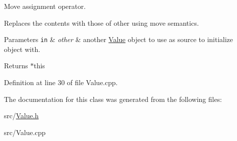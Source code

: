 Move assignment operator. 

Replaces the contents with those of other using move semantics. 
\begin{DoxyParams}[1]{Parameters}
\mbox{\tt in}  & {\em other} & another \hyperlink{a00015}{Value} object to use as source to initialize object with. \\
\hline
\end{DoxyParams}
\begin{DoxyReturn}{Returns}
$\ast$this 
\end{DoxyReturn}


Definition at line 30 of file Value.\-cpp.



The documentation for this class was generated from the following files\-:\begin{DoxyCompactItemize}
\item 
src/\hyperlink{a00037}{Value.\-h}\item 
src/Value.\-cpp\end{DoxyCompactItemize}
